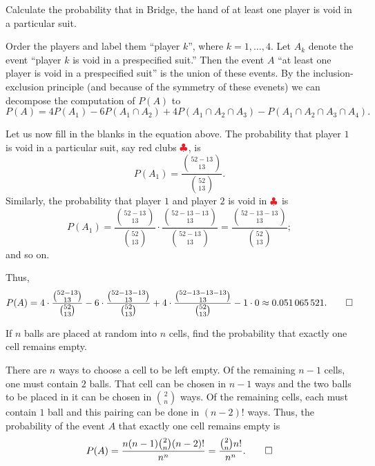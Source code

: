 \begin{problem}[Handout 2, \# 7]
  Calculate the probability that in Bridge, the hand of at least one player
  is void in a particular suit.
\end{problem}
\begin{solution*}
  Order the players and label them ``player \(k\)'', where
  \(k=1,\dotsc,4\). Let \(A_k\) denote the event ``player \(k\) is void in
  a prespecified suit.'' Then the event \(A\) ``at least one player is void
  in a prespecified suit'' is the union of these events. By the
  inclusion-exclusion principle (and because of the symmetry of these
  evenets) we can decompose the computation of \(P(A)\) to
  \[
    P(A)=4P(A_1)-6P(A_1\cap A_2)+4P(A_1\cap A_2\cap A_3)-P(A_1\cap A_2\cap
    A_3\cap A_4).
  \]

  Let us now fill in the blanks in the equation above. The probability that
  player \(1\) is void in a particular suit, say red clubs
  \(\color{Red}\clubsuit\), is
  \[
    P(A_1)=\frac{\binom{52-13}{13}}{\binom{52}{13}}.
  \]
  Similarly, the probability that player \(1\) and player \(2\) is void in
  \(\color{Red}\clubsuit\) is
  \[
    P(A_1)=\frac{\binom{52-13}{13}}{\binom{52}{13}}%
    \cdot\frac{\binom{52-13-13}{13}}%
    {\binom{52-13}{13}}%
    =\frac{\binom{52-13-13}{13}}{\binom{52}{13}};
  \]
  and so on.

  Thus,
  \[
    P(A)=4\cdot\frac{\binom{52-13}{13}}{\binom{52}{13}}
    -6\cdot\frac{\binom{52-13-13}{13}}{\binom{52}{13}}
    +4\cdot\frac{\binom{52-13-13-13}{13}}{\binom{52}{13}} -1\cdot0\approx
    \num{0.051065521}.\qedhere
  \]
\end{solution*}

\begin{problem}[Handout 2, \# 12]
  If \(n\) balls are placed at random into \(n\) cells, find the
  probability that exactly one cell remains empty.
\end{problem}
\begin{solution*}
  There are \(n\) ways to choose a cell to be left empty. Of the remaining
  \(n-1\) cells, one must contain \(2\) balls. That cell can be chosen in
  \(n-1\) ways and the two balls to be placed in it can be chosen in
  \(\binom{2}{n}\) ways. Of the remaining cells, each must contain \(1\)
  ball and this pairing can be done in \((n-2)!\) ways. Thus, the
  probability of the event \(A\) that exactly one cell remains empty is
  \[
    P(A)=\frac{n(n-1)\binom{2}{n}(n-2)!}{n^n}=\frac{\binom{2}{n}n!}{n^n}.
    \qedhere
  \]
\end{solution*}

